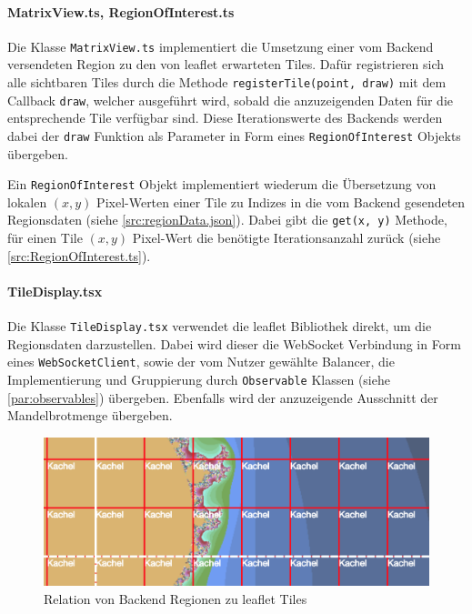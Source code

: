 \paragraph{MatrixView.ts, RegionOfInterest.ts}\label{par:matrixView}
Die Klasse \verb|MatrixView.ts| implementiert die Umsetzung einer vom Backend versendeten Region zu
den von leaflet erwarteten Tiles. Dafür registrieren sich alle sichtbaren Tiles durch die Methode
\verb|registerTile(point, draw)| mit dem Callback \verb|draw|, welcher ausgeführt wird, sobald die anzuzeigenden Daten für die
entsprechende Tile verfügbar sind. Diese Iterationswerte des Backends werden dabei der \verb|draw| Funktion als Parameter
in Form eines \verb|RegionOfInterest| Objekts übergeben.

Ein \verb|RegionOfInterest| Objekt implementiert wiederum die Übersetzung von lokalen \( (x,y) \) Pixel-Werten
einer Tile zu Indizes in die vom Backend gesendeten Regionsdaten (siehe \autoref{src:regionData.json}). Dabei gibt die
\verb|get(x, y)| Methode, für einen Tile \( (x,y) \) Pixel-Wert die benötigte Iterationsanzahl zurück (siehe \autoref{src:RegionOfInterest.ts}).

\begin{figure}[h!]
	
\end{figure}

\paragraph{TileDisplay.tsx}
Die Klasse \verb|TileDisplay.tsx| verwendet die leaflet Bibliothek direkt, um die Regionsdaten darzustellen.
Dabei wird dieser die WebSocket Verbindung in Form eines \verb|WebSocketClient|, sowie der vom Nutzer gewählte Balancer,
die Implementierung und Gruppierung durch \verb|Observable| Klassen (siehe \autoref{par:observables}) übergeben. Ebenfalls wird der anzuzeigende Ausschnitt der
Mandelbrotmenge übergeben.

\begin{figure}[h!]
	\centering
	\includegraphics[width=0.5\linewidth]{img/Implementierung/leafletTiles}
	\caption{Relation von Backend Regionen zu leaflet Tiles}
	\label{fig:leafletTiles}
\end{figure}

